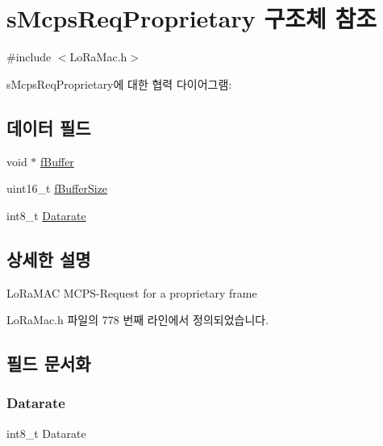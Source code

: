 \hypertarget{structs_mcps_req_proprietary}{}\section{s\+Mcps\+Req\+Proprietary 구조체 참조}
\label{structs_mcps_req_proprietary}


{\ttfamily \#include $<$Lo\+Ra\+Mac.\+h$>$}



s\+Mcps\+Req\+Proprietary에 대한 협력 다이어그램\+:
\subsection*{데이터 필드}
\begin{DoxyCompactItemize}
\item 
void $\ast$ \mbox{\hyperlink{structs_mcps_req_proprietary_a2e9f11cf5a8f2a797999359bedee31af}{f\+Buffer}}
\item 
uint16\+\_\+t \mbox{\hyperlink{structs_mcps_req_proprietary_a6b4fc83528d7391a193516d9f4ba985b}{f\+Buffer\+Size}}
\item 
int8\+\_\+t \mbox{\hyperlink{structs_mcps_req_proprietary_ae2f6080f3aa0e9485c55513ca56bb24d}{Datarate}}
\end{DoxyCompactItemize}


\subsection{상세한 설명}
Lo\+Ra\+M\+AC M\+C\+P\+S-\/\+Request for a proprietary frame 

Lo\+Ra\+Mac.\+h 파일의 778 번째 라인에서 정의되었습니다.



\subsection{필드 문서화}
\mbox{\label{structs_mcps_req_proprietary_ae2f6080f3aa0e9485c55513ca56bb24d}} 
\subsubsection{\texorpdfstring{Datarate}{Datarate}}
{\footnotesize\ttfamily int8\+\_\+t Datarate}


